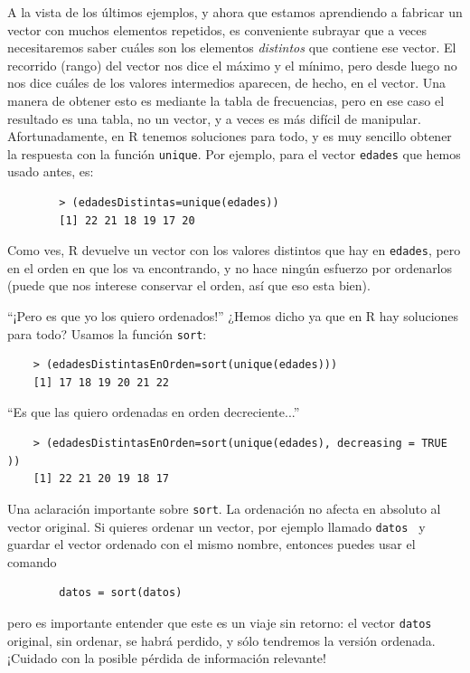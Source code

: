 \documentclass[10pt,a4paper]{article}\usepackage[]{graphicx}\usepackage[]{color}
\newcounter {cont01}
\begin{document}
A la vista de los últimos ejemplos, y ahora que estamos aprendiendo a fabricar un vector con muchos elementos repetidos, es conveniente subrayar que a veces necesitaremos saber cuáles son los elementos {\em distintos} que contiene ese vector. El recorrido (rango) del vector nos dice el máximo y el mínimo, pero desde luego no nos dice cuáles de los valores intermedios aparecen, de hecho, en el vector. Una manera de obtener esto es mediante la tabla de frecuencias, pero en ese caso el resultado es una tabla, no un vector, y a veces es más difícil de manipular. Afortunadamente, en R tenemos soluciones para todo, y es muy sencillo obtener la respuesta con la función {\tt unique}. Por ejemplo, para el vector {\tt edades} que hemos usado antes, es:
        \begin{verbatim}
        > (edadesDistintas=unique(edades))
        [1] 22 21 18 19 17 20
        \end{verbatim}
Como ves, R devuelve un vector con los valores distintos que hay en {\tt edades}, pero en el orden en que los va encontrando, y no hace ningún esfuerzo por ordenarlos (puede que nos interese conservar el orden, así que eso esta bien).

``¡Pero es que yo los quiero ordenados!'' ¿Hemos dicho ya que en R hay soluciones para todo? Usamos la función {\tt sort}:
    \begin{verbatim}
    > (edadesDistintasEnOrden=sort(unique(edades)))
    [1] 17 18 19 20 21 22
    \end{verbatim}
``Es que las quiero ordenadas en orden decreciente...''
    \begin{verbatim}
    > (edadesDistintasEnOrden=sort(unique(edades), decreasing = TRUE ))
    [1] 22 21 20 19 18 17
    \end{verbatim}
Una aclaración importante sobre {\tt sort}. La ordenación no afecta en absoluto al vector original. Si quieres ordenar un vector, por ejemplo llamado {\tt datos } y guardar el vector ordenado con el mismo nombre, entonces puedes usar el comando
    \begin{verbatim}
        datos = sort(datos)
    \end{verbatim}
pero es importante entender que este es un viaje sin retorno: el vector {\tt datos} original, sin ordenar, se habrá perdido, y sólo tendremos la versión ordenada. ¡Cuidado con la posible pérdida de información relevante!
\end{document}
